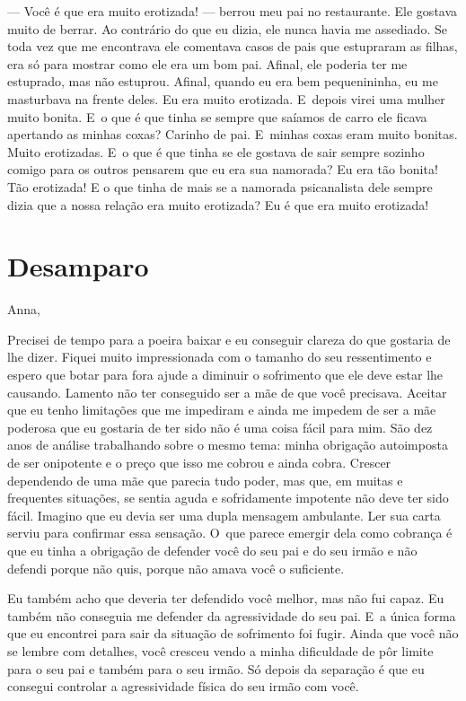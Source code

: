 --- Você é que era muito erotizada! --- berrou meu pai no restaurante.
Ele gostava muito de berrar. Ao contrário do que eu dizia, ele nunca
havia me assediado. Se toda vez que me encontrava ele comentava casos de
pais que estupraram as filhas, era só para mostrar como ele era um bom
pai. Afinal, ele poderia ter me estuprado, mas não estuprou. Afinal,
quando eu era bem pequenininha, eu me masturbava na frente deles. Eu era
muito erotizada. E~depois virei uma mulher muito bonita. E~o que é que
tinha se sempre que saíamos de carro ele ficava apertando as minhas
coxas? Carinho de pai. E~minhas coxas eram muito bonitas. Muito
erotizadas. E~o que é que tinha se ele gostava de sair sempre sozinho
comigo para os outros pensarem que eu era sua namorada? Eu era tão
bonita! Tão erotizada! E o que tinha de mais se a namorada psicanalista
dele sempre dizia que a nossa relação era muito erotizada? Eu é que era
muito erotizada!

\chapter{Desamparo}

Anna,

\smallskip{} 

Precisei de tempo para a poeira baixar e eu conseguir clareza do que
gostaria de lhe dizer. Fiquei muito impressionada com o tamanho do seu
ressentimento e espero que botar para fora ajude a diminuir o sofrimento
que ele deve estar lhe causando. Lamento não ter conseguido ser a mãe de
que você precisava. Aceitar que eu tenho limitações que me impediram e
ainda me impedem de ser a mãe poderosa que eu gostaria de ter sido não é
uma coisa fácil para mim. São dez anos de análise trabalhando sobre o
mesmo tema: minha obrigação autoimposta de ser onipotente e o preço que
isso me cobrou e ainda cobra. Crescer dependendo de uma mãe que parecia
tudo poder, mas que, em muitas e frequentes situações, se sentia aguda e
sofridamente impotente não deve ter sido fácil. Imagino que eu devia ser
uma dupla mensagem ambulante. Ler sua carta serviu para confirmar essa
sensação. O~que parece emergir dela como cobrança é que eu tinha a
obrigação de defender você do seu pai e do seu irmão e não defendi
porque não quis, porque não amava você o suficiente.

Eu também acho que deveria ter defendido você melhor, mas não fui capaz.
Eu também não conseguia me defender da agressividade do seu pai. E~a
única forma que eu encontrei para sair da situação de sofrimento foi
fugir. Ainda que você não se lembre com detalhes, você cresceu vendo a
minha dificuldade de pôr limite para o seu pai e também para o seu
irmão. Só depois da separação é que eu consegui controlar a
agressividade física do seu irmão com você.

